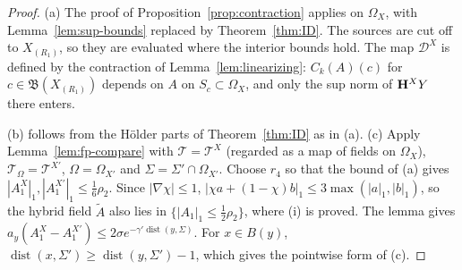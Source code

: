\begin{proof}
(a) The proof of Proposition~\ref{prop:contraction} applies on $\Omega_X$, with Lemma~\ref{lem:sup-bounds} replaced by Theorem~\ref{thm:ID}. The sources are cut off to $X_{(R_1)}$, so they are evaluated where the interior bounds hold. The map $\mathcal D^X$ is defined by the contraction of Lemma~\ref{lem:linearizing}: $C_k(A)(c)$ for $c\in\mathfrak B(X_{(R_1)})$ depends on $A$ on $S_c\subset\Omega_X$, and only the sup norm of $\mathbf H^XY$ there enters.

(b) follows from the H\"older parts of Theorem~\ref{thm:ID} as in (a). (c) Apply Lemma~\ref{lem:fp-compare} with $\mathcal T=\mathcal T^X$ (regarded as a map of fields on $\Omega_X$), $\mathcal T_\Omega=\mathcal T^{X'}$, $\Omega=\Omega_{X'}$ and $\Sigma=\Sigma'\cap\Omega_{X'}$. Choose $r_4$ so that the bound of (a) gives $|A^X_1|_1,|A^{X'}_1|_1\le\frac16\rho_2$. Since $|\nabla\chi|\le1$, $|\chi a+(1-\chi)b|_1\le3\max(|a|_1,|b|_1)$, so the hybrid field $\tilde A$ also lies in $\{|A_1|_1\le\frac12\rho_2\}$, where (i) is proved. The lemma gives $a_y(A^X_1-A^{X'}_1)\le2\sigma e^{-\gamma'\operatorname{dist}(y,\Sigma)}$. For $x\in B(y)$, $\operatorname{dist}(x,\Sigma')\ge\operatorname{dist}(y,\Sigma')-1$, which gives the pointwise form of (c).


\end{proof}
